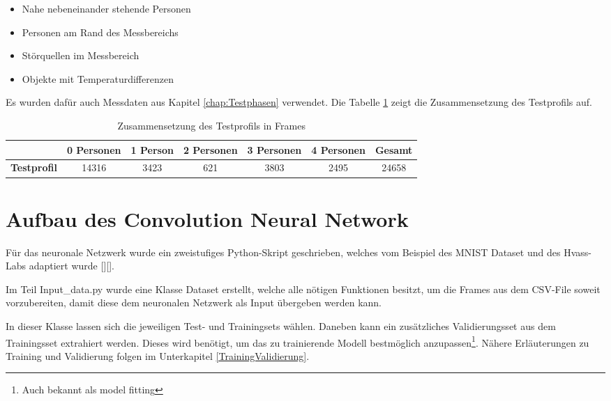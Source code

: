 \begin{itemize}
	\item Nahe nebeneinander stehende Personen 
	\item Personen am Rand des Messbereichs
	\item Störquellen im Messbereich
	\item Objekte mit Temperaturdifferenzen
\end{itemize}

Es wurden dafür auch Messdaten aus Kapitel \ref{chap:Testphasen} verwendet. Die Tabelle \ref{tab:Testprofil} zeigt die Zusammensetzung des Testprofils auf.

\begin{table}[H]
	\centering
	\caption[Zusammensetzung  des Testprofils in Frames]{Zusammensetzung  des Testprofils in Frames}
	\label{tab:Testprofil}
	\begin{tabular}{|c|c|c|c|c|c|c|}
		\hline
		\rowcolor[HTML]{9B9B9B} 
		\multicolumn{1}{|l|}{\cellcolor[HTML]{9B9B9B}}                   & \multicolumn{1}{l|}{\cellcolor[HTML]{9B9B9B}\textbf{0 Personen}} & \textbf{1 Person} & \textbf{2 Personen} & \textbf{3 Personen} & \textbf{4 Personen} & \textbf{Gesamt} \\ \hline
		\cellcolor[HTML]{9B9B9B}\textbf{Testprofil}                         & 14316                                                          & 3423             & 621               & 3803                & 2495               & 24658          \\ \hline
	\end{tabular}
\end{table}

\section{Aufbau des Convolution Neural Network}
\label{AufbauConv}

Für das neuronale Netzwerk wurde ein zweistufiges Python-Skript geschrieben, welches vom Beispiel des \ac{MNIST Dataset} und des Hvass-Labs adaptiert wurde [\protect\cite{Tensorflow}][\protect\cite{HVASS}].

Im Teil Input\_data.py wurde eine Klasse Dataset erstellt, welche alle nötigen Funktionen besitzt, um die Frames aus dem \ac{CSV}-File soweit vorzubereiten, damit diese dem neuronalen Netzwerk als Input übergeben werden kann. 

In dieser Klasse lassen sich die jeweiligen Test- und Trainingsets wählen. Daneben kann ein zusätzliches Validierungsset aus dem Trainingsset extrahiert werden. Dieses wird benötigt, um das zu trainierende Modell bestmöglich anzupassen\footnote[26]{Auch bekannt als model fitting}. Nähere Erläuterungen zu Training und Validierung folgen im Unterkapitel \ref{TrainingValidierung}.

